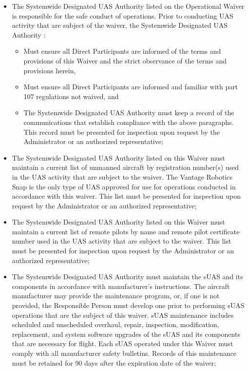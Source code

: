 \documentclass[
]{book}
\providecommand{\tightlist}{%
  \setlength{\itemsep}{0pt}\setlength{\parskip}{0pt}}
\begin{document}
\begin{itemize}
\item
  The Systemwide Designated UAS Authority listed on the Operational Waiver is responsible for the safe conduct of operations. Prior to conducting UAS activity that are subject of the waiver, the Systemwide Designated UAS Authority :

  \begin{itemize}
  \tightlist
  \item
    Must ensure all Direct Participants are informed of the terms and provisions of this Waiver and the strict observance of the terms and provisions herein,
  \item
    Must ensure all Direct Participants are informed and familiar with part 107 regulations not waived, and
  \item
    The Systemwide Designated UAS Authority must keep a record of the communications that establish compliance with the above paragraphs. This record must be presented for inspection upon request by the Administrator or an authorized representative;
  \end{itemize}
\item
  The Systemwide Designated UAS Authority listed on this Waiver must maintain a current list of unmanned aircraft by registration number(s) used in the UAS activity that are subject to the waiver. The Vantage Robotics Snap is the only type of UAS approved for use for operations conducted in accordance with this waiver. This list must be presented for inspection upon request by the Administrator or an authorized representative;
\item
  The Systemwide Designated UAS Authority listed on this Waiver must maintain a current list of remote pilots by name and remote pilot certificate number used in the UAS activity that are subject to the waiver. This list must be presented for inspection upon request by the Administrator or an authorized representative;
\item
  The Systemwide Designated UAS Authority must maintain the sUAS and its components in accordance with manufacturer's instructions. The aircraft manufacturer may provide the maintenance program, or, if one is not provided, the Responsible Person must develop one prior to performing sUAS operations that are the subject of this waiver. sUAS maintenance includes scheduled and unscheduled overhaul, repair, inspection, modification, replacement, and system software upgrades of the sUAS and its components that are necessary for flight. Each sUAS operated under this Waiver must comply with all manufacturer safety bulletins. Records of this maintenance must be retained for 90 days after the expiration date of the waiver;

\end{itemize}
\end{document}
